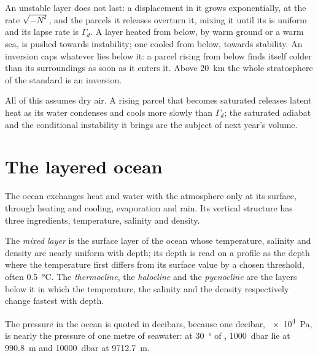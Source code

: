 An unstable layer does not last: a displacement in it grows exponentially, at
the rate $\sqrt{-N^2}$, and the parcels it releases overturn it, mixing it until
its  is uniform and its lapse rate is $\Gamma_d$. A layer
heated from below, by warm ground or a warm sea, is pushed towards instability;
one cooled from below, towards stability. An inversion caps whatever lies below
it: a parcel rising from below finds itself colder than its surroundings as soon
as it enters it. Above \qty{20}{km} the whole stratosphere of the standard is an
inversion.

All of this assumes dry air. A rising parcel that becomes saturated releases
latent heat as its water condenses and cools more slowly than $\Gamma_d$; the
saturated adiabat and the conditional instability it brings are the subject of
next year's volume.

\section{The layered ocean}\label{sec:b1:fluid-envelopes-structure:ocean}

The ocean exchanges heat and water with the atmosphere only at its surface,
through heating and cooling, evaporation and rain. Its vertical structure has
three ingredients, temperature, salinity and density.

\begin{definition}\label{def:b1:fluid-envelopes-structure:ocean-layers}
The \emph{mixed layer} is the surface layer of the ocean
whose temperature, salinity and density are nearly uniform with depth; its
depth is read on a profile as the depth where the temperature first differs from
its surface value by a chosen threshold, often \qty{0.5}{\celsius}. The
\emph{thermocline}, the \emph{halocline} and
the \emph{pycnocline} are the layers below it in which the
temperature, the salinity and the density respectively change fastest with
depth.
\end{definition}

The pressure in the ocean is quoted in decibars, because one decibar,
\qty{e4}{Pa}, is nearly the pressure of one metre of seawater: at
\qty{30}{\degree} of , \qty{1000}{dbar} lie at \qty{990.8}{m} and
\qty{10000}{dbar} at \qty{9712.7}{m}.

